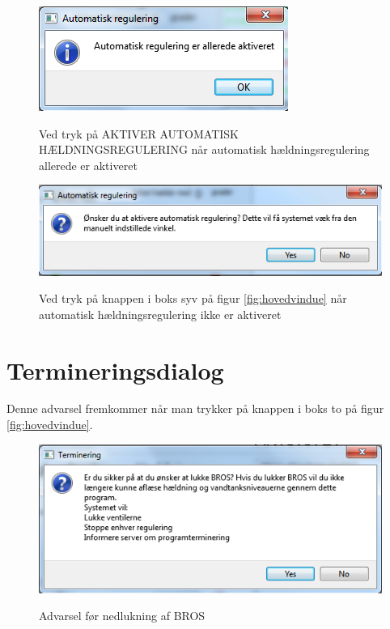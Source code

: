 \begin{figure}[h]
\centering
\includegraphics[scale=0.8]{billeder/GUI/auto_aktiveret}
\label{fig:auto_accept}
\caption{Ved tryk på AKTIVER AUTOMATISK HÆLDNINGSREGULERING når automatisk hældningsregulering allerede er aktiveret}
\end{figure}

\begin{figure}[h]
\centering
\includegraphics[scale=0.8]{billeder/GUI/aktiver_auto}
\label{fig:auto_denial}
\caption{Ved tryk på knappen i boks syv på figur \ref{fig:hovedvindue} når automatisk hældningsregulering ikke er aktiveret}
\end{figure}

\section*{Termineringsdialog}
Denne advarsel fremkommer når man trykker på knappen i boks to på figur \ref{fig:hovedvindue}.

\begin{figure}[h]
\centering
\includegraphics[scale=0.8]{billeder/GUI/termineringsvindue}
\label{fig:terminering}
\caption{Advarsel før nedlukning af BROS}
\end{figure}